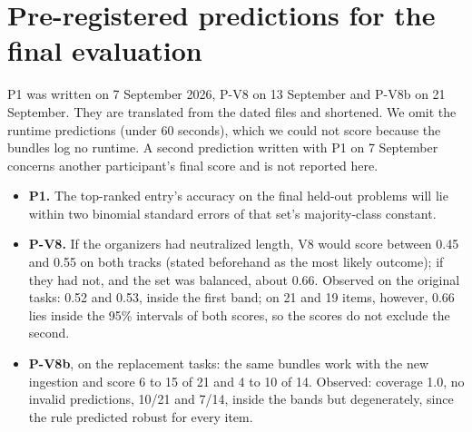 \section{Pre-registered predictions for the final evaluation}\label{app:B}

P1 was written on 7 September 2026, P-V8 on 13 September and P-V8b on 21 September. They are translated from the dated files and shortened. We omit the runtime predictions (under 60 seconds), which we could not score because the bundles log no runtime. A second prediction written with P1 on 7 September concerns another participant's final score and is not reported here.

\begin{itemize}
\item \textbf{P1.} The top-ranked entry's accuracy on the final held-out problems will lie within two binomial standard errors of that set's majority-class constant.
\item \textbf{P-V8.} If the organizers had neutralized length, V8 would score between 0.45 and 0.55 on both tracks (stated beforehand as the most likely outcome); if they had not, and the set was balanced, about 0.66. Observed on the original tasks: 0.52 and 0.53, inside the first band; on 21 and 19 items, however, 0.66 lies inside the 95\% intervals of both scores, so the scores do not exclude the second.
\item \textbf{P-V8b}, on the replacement tasks: the same bundles work with the new ingestion and score 6 to 15 of 21 and 4 to 10 of 14. Observed: coverage 1.0, no invalid predictions, 10/21 and 7/14, inside the bands but degenerately, since the rule predicted robust for every item.
\end{itemize}
